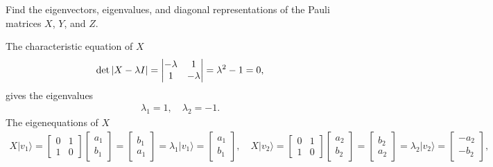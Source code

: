 \documentclass[en]{sol-man}
\begin{document}
\begin{exe}
    Find the eigenvectors, eigenvalues, and diagonal representations of the Pauli matrices $X$, $Y$, and $Z$.
\end{exe}
\begin{sol}
    The characteristic equation of $X$
    \begin{align}
        \det\left\lvert X-\lambda I\right\rvert=\left\lvert\begin{matrix}
            -\lambda&1\\
            1&-\lambda
        \end{matrix}\right\rvert=\lambda^2-1=0,
    \end{align}
    gives the eigenvalues
    \begin{align}
        \lambda_1=1,\quad\lambda_2=-1.
    \end{align}
    The eigenequations of $X$
    \begin{align}
        X\lvert v_1\rangle=\begin{bmatrix}
            0&1\\
            1&0
        \end{bmatrix}\begin{bmatrix}
            a_1\\
            b_1
        \end{bmatrix}=\begin{bmatrix}
            b_1\\
            a_1
        \end{bmatrix}=\lambda_1\lvert v_1\rangle=\begin{bmatrix}
            a_1\\
            b_1
        \end{bmatrix},\quad X\lvert v_2\rangle=\begin{bmatrix}
            0&1\\
            1&0
        \end{bmatrix}\begin{bmatrix}
            a_2\\
            b_2
        \end{bmatrix}=\begin{bmatrix}
            b_2\\
            a_2
        \end{bmatrix}=\lambda_2\lvert v_2\rangle=\begin{bmatrix}
            -a_2\\
            -b_2
        \end{bmatrix},

\end{align}
\end{sol}
\end{document}
